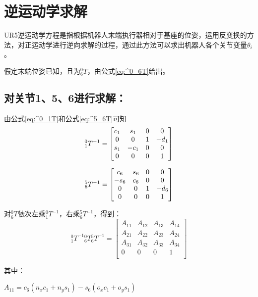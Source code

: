 \documentclass{seuthesis-2022}
\numberwithin{equation}{section}
\begin{document}
\section{逆运动学求解}\label{逆运动学}
UR5逆运动学方程是指根据机器人末端执行器相对于基座的位姿，运用反变换的方法，对正运动学进行逆向求解的过程，通过此方法可以求出机器人各个关节变量$\theta_i$。

假定末端位姿已知，且为$^0_6T$，由公式\eqref{eq:^0_6T}给出。

\subsection{对关节1、5、6进行求解：}
由公式\eqref{eq:^0_1T}和公式\eqref{eq:^5_6T}可知
\begin{equation}
  ^0_1T^{-1}=
  \begin{bmatrix}
    c_1 & s_1 & 0 & 0\\
    0 & 0 & 1 & -d_1\\
    s_1 & -c_1 & 0 & 0\\
    0 & 0 & 0 & 1\\
  \end{bmatrix}
  \label{eq:^0_1T^{-1}}
\end{equation}

\begin{equation}
  ^5_6T^{-1}=
  \begin{bmatrix}
    c_6 & s_6 & 0 & 0\\
    -s_6 & c_6 & 0 & 0\\
    0 & 0 & 1 & -d_6\\
    0 & 0 & 0 & 1\\
  \end{bmatrix}
  \label{eq:^5_6T^{-1}}
\end{equation}

对$^0_6T$依次左乘$^0_1T^{-1}$，右乘$^5_6T^{-1}$，得到：
\begin{equation}
  {^0_1T^{-1}} {^0_6T} {^5_6T^{-1}} =
  \begin{bmatrix}
    A_{11} & A_{12} & A_{13} & A_{14}\\
    A_{21} & A_{22} & A_{23} & A_{24}\\
    A_{31} & A_{32} & A_{33} & A_{34}\\
    0 & 0 & 0 & 1\\
  \end{bmatrix}
  \label{eq:^1_5T逆}
\end{equation}

其中：

$A_{11} = c_6(n_xc_1+n_ys_1)-s_6(o_xc_1+o_ys_1)$
\end{document}
